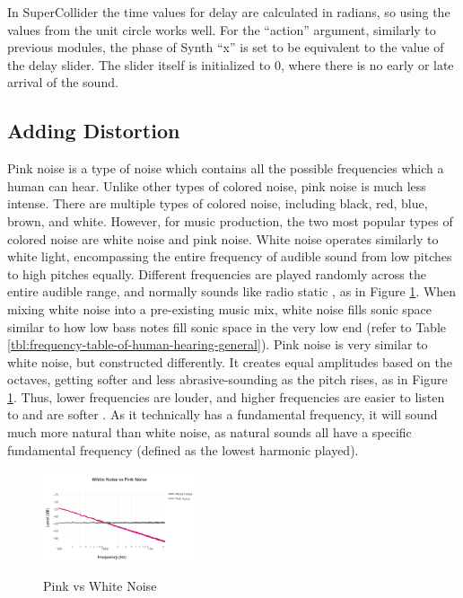 In SuperCollider the time values for delay are calculated in radians, so using the values from the unit circle works well. For the ``action'' argument, similarly to previous modules, the phase of Synth ``x'' is set to be equivalent to the value of the delay slider. The slider itself is initialized to 0, where there is no early or late arrival of the sound.

\subsection{Adding Distortion}

Pink noise is a type of noise which contains all the possible frequencies which a human can hear. Unlike other types of colored noise, pink noise is much less intense. There are multiple types of colored noise, including black, red, blue, brown, and white. However, for music production, the two most popular types of colored noise are white noise and pink noise. White noise operates similarly to white light, encompassing the entire frequency of audible sound from low pitches to high pitches equally. Different frequencies are played randomly across the entire audible range, and normally sounds like radio static \cite{Unison_2021}, as in Figure \ref{fig:pink-vs-white-noise}. When mixing white noise into a pre-existing music mix, white noise fills sonic space similar to how low bass notes fill sonic space in the very low end (refer to Table \ref{tbl:frequency-table-of-human-hearing-general}). Pink noise is very similar to white noise, but constructed differently. It creates equal amplitudes based on the octaves, getting softer and less abrasive-sounding as the pitch rises, as in Figure \ref{fig:pink-vs-white-noise}. Thus, lower frequencies are louder, and higher frequencies are easier to listen to and are softer \cite{Unison_2021}. As it technically has a fundamental frequency, it will sound much more natural than white noise, as natural sounds all have a specific fundamental frequency (defined as the lowest harmonic played).

\begin{figure}[H]
    \centering
    \includegraphics[width=0.4\textwidth]{figures/pinkvswhitenoise.png}
    \caption{Pink vs White Noise}\cite{Hyperacusis_Focus_2022}
    \label{fig:pink-vs-white-noise}
\end{figure}

